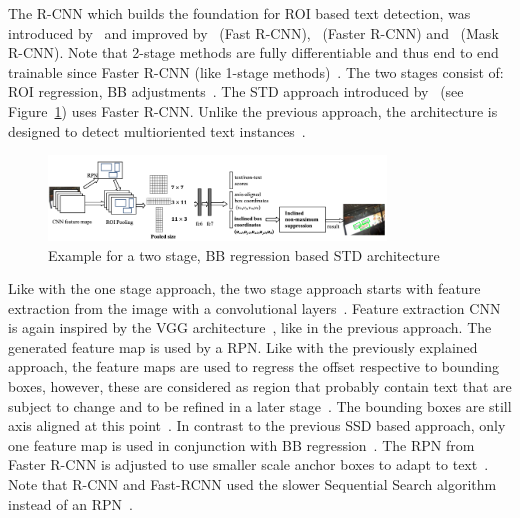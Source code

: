 The R-CNN which builds the foundation for \ac{ROI} based text detection, was introduced
by~\cite{girshick_rich_2014} and improved by~\cite{girshick_fast_2015} (Fast
R-CNN),~\cite{ren_faster_2015} (Faster R-CNN) and~\cite{he_mask_2018} (Mask R-CNN).
Note that 2-stage methods are fully differentiable and thus end to end trainable since
Faster R-CNN (like 1-stage methods)~\citep{ren_faster_2015,long_scene_2021}.
The two stages consist of: \ac{ROI} regression, \ac{BB}
adjustments~\citep{jiang_r2cnn_2017, ren_faster_2015}.
The \ac{STD} approach introduced by~\cite{jiang_r2cnn_2017} (see Figure~\ref{fig:STD-segfree-rcnn})
uses Faster R-CNN.%
Unlike the previous approach, the architecture is designed to detect multioriented text
instances~\citep{jiang_r2cnn_2017,liao_textboxes_2017}.
\begin{figure}[ht]
    \centering
    \includegraphics[width=0.8\textwidth]{img/STD-seg-free-Jiang-R2CNN-2017.png}
    \caption[Two stage, BB regression based STD architecture]{%
        Example for a two stage, BB regression based STD
        architecture~\citep{jiang_r2cnn_2017}\label{fig:STD-segfree-rcnn}
    }
\end{figure}
Like with the one stage approach, the two stage approach starts with feature extraction from the
image with a convolutional layers~\citep{jiang_r2cnn_2017}.
Feature extraction \ac{CNN} is again inspired by the VGG architecture~\citep{jiang_r2cnn_2017},
like in the previous approach.
The generated feature map is used by a \ac{RPN}.
Like with the previously explained approach, the feature maps are used to regress the offset
respective to bounding boxes, however, these are considered as region that probably contain text
that are subject to change and to be refined in a later
stage~\citep{jiang_r2cnn_2017,lu_mimicdet_2020}.
The bounding boxes are still axis aligned at this point~\citep{jiang_r2cnn_2017}.
In contrast to the previous \ac{SSD} based approach, only one feature map is used in conjunction with
\ac{BB} regression~\citep{jiang_r2cnn_2017}.
The \ac{RPN} from Faster R-CNN is adjusted to use smaller scale anchor boxes to adapt to
text~\citep{jiang_r2cnn_2017}.
Note that R-CNN and Fast-RCNN used the slower Sequential Search algorithm instead of an
\ac{RPN}~\citep{girshick_rich_2014,girshick_fast_2015}.
